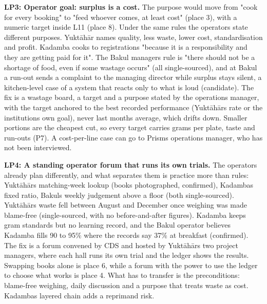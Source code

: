 \documentclass[
  10pt,
  table]{article}
\begin{document}
\textbf{LP3: Operator goal: surplus is a cost.} The purpose would move from "cook for every booking" to "feed whoever comes, at least cost" (place 3), with a numeric target inside L11 (place 8). Under the same rules the operators state different purposes. Yuktāhār names quality, less waste, lower cost, standardisation and profit. Kadamba cooks to registrations "because it is a responsibility and they are getting paid for it". The Bakul manager\textquotesingle s rule is "there should not be a shortage of food, even if some wastage occurs" (all single-sourced), and at Bakul a run-out sends a complaint to the managing director while surplus stays silent, a kitchen-level case of a system that reacts only to what is loud (candidate). The fix is a wastage board, a target and a purpose stated by the operations manager, with the target anchored to the best recorded performance (Yuktāhār\textquotesingle s rate or the institution\textquotesingle s own goal), never last month\textquotesingle s average, which drifts down. Smaller portions are the cheapest cut, so every target carries grams per plate, taste and run-outs (P7). A cost-per-line case can go to Prism\textquotesingle s operations manager, who has not been interviewed.

\textbf{LP4: A standing operator forum that runs its own trials.} The operators already plan differently, and what separates them is practice more than rules: Yuktāhār\textquotesingle s matching-week lookup (books photographed, confirmed), Kadamba\textquotesingle s fixed ratio, Bakul\textquotesingle s weekly judgement above a floor (both single-sourced). Yuktāhār\textquotesingle s waste fell between August and December once weighing was made blame-free (single-sourced, with no before-and-after figures). Kadamba keeps gram standards but no learning record, and the Bakul operator believes Kadamba fills 90 to 95\% where the records say 37\% at breakfast (confirmed). The fix is a forum convened by CDS and hosted by Yuktāhār\textquotesingle s two project managers, where each hall runs its own trial and the ledger shows the results. Swapping books alone is place 6, while a forum with the power to use the ledger to choose what works is place 4. What has to transfer is the preconditions: blame-free weighing, daily discussion and a purpose that treats waste as cost. Kadamba\textquotesingle s layered chain adds a reprimand risk.
\end{document}
